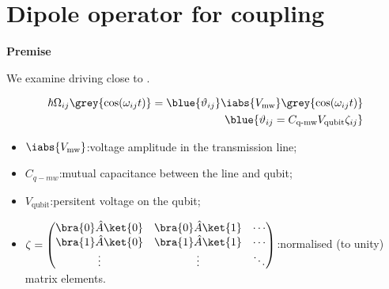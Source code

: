 \newpage
\section{Dipole          operator          for          coupling          \cite{Astafiev2010}
  \cite{abdumalikov2010} \label{sec:dipole_coupling}}

\begin{framed}\noindent
  \textbf{Premise}

  We examine driving close to \ilra{}.
\end{framed}

\begin{minipage}[l]{0.5\linewidth}%
  \begin{framed}\noindent
    \begin{equation}\label{eq:couple1}
      \begin{aligned}
        \hbar\Omega_{ij}\grey{\cos(\omega_{ij}t)} = \blue{\vartheta_{ij}}\iabs{V_\text{mw}}\grey{\cos(\omega_{ij}t)} & \\
        \blue{\vartheta_{ij} = C_\text{q-mw}V_\text{qubit}\zeta_{ij}} &
      \end{aligned}
    \end{equation}

    \begin{itemize}
    \item $ \iabs{V_\text{mw}} $:\hfill voltage amplitude in the transmission line;
    \item $ C_{q-mw} $:\hfill mutual capacitance between the line and qubit;
    \item $ V_\text{qubit} $:\hfill persitent voltage on the qubit;
    \item $ \zeta = \begin{pmatrix}
        \bra{0}\hat{A}\ket{0} & \bra{0}\hat{A}\ket{1} & \cdots\\
        \bra{1}\hat{A}\ket{0} & \bra{1}\hat{A}\ket{1} & \cdots\\
        \vdots & \vdots & \ddots
      \end{pmatrix} $:\hfill normalised (to unity) matrix elements.
    \end{itemize}%
  \end{framed}%
\end{minipage}%
